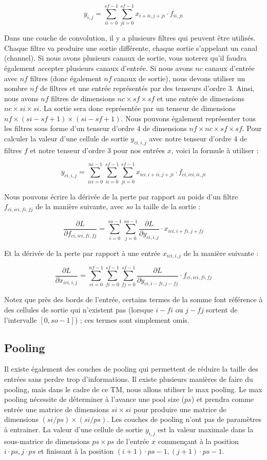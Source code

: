 \documentclass{article}
\begin{document}
\[
y_{i,j} = \sum_{ii=0}^{sf-1} \sum_{ji=0}^{sf-1} x_{i+ii,j+ji} \cdot f_{ii,ji}
\]

Dans une couche de convolution, il y a plusieurs filtres qui peuvent être utilisés. Chaque filtre va produire une sortie différente, chaque sortie s'appelant un canal (channel). Si nous avons plusieurs canaux de sortie, vous noterez qu'il faudra également accepter plusieurs canaux d'entrée. Si nous avons $nc$ canaux d'entrée avec $nf$ filtres (donc également $nf$ canaux de sortie), nous devons utiliser un nombre $nf$ de filtres et une entrée représentés par des tenseurs d'ordre 3. Ainsi, nous avons $nf$ filtres de dimensions $nc \times sf \times sf$ et une entrée de dimensions $nc \times si \times si$. La sortie sera donc représentée par un tenseur de dimensions $nf \times (si - sf + 1) \times (si - sf + 1)$. Nous pouvons également représenter tous les filtres sous forme d'un tenseur d'ordre 4 de dimensions $nf \times nc \times sf \times sf$. Pour calculer la valeur d'une cellule de sortie $y_{ci,i,j}$ avec notre tenseur d'ordre 4 de filtres $f$ et notre tenseur d'ordre 3 pour nos entrées $x$, voici la formule à utiliser : 

\[
y_{ci,i,j} = \sum_{ici=0}^{nc-1} \sum_{ii=0}^{sf-1} \sum_{ji=0}^{sf-1} x_{ici,i+ii,j+ji} \cdot f_{ci,ici,ii,ji}
\]

Nous pouvons écrire la dérivée de la perte par rapport au poids d'un filtre $f_{ci,ici,fi,fj}$ de la manière suivante, avec $so$ la taille de la sortie :

\[
\frac{\partial L}{\partial f_{ci,ici,fi,fj}} = \sum_{i=0}^{so-1} \sum_{j=0}^{so-1} \frac{\partial L}{\partial y_{ci,i,j}} \cdot x_{ici,i+fi,j+fj}
\]

Et la dérivée de la perte par rapport à une entrée $x_{ici,i,j}$ de la manière suivante :

\[
\frac{\partial L}{\partial x_{ici,i,j}} = \sum_{ci=0}^{nf-1} \sum_{fi=0}^{sf-1} \sum_{fj=0}^{sf-1} \frac{\partial L}{\partial y_{ci,i-fi,j-fj}} \cdot f_{ci,ici,fi,fj}
\]

Notez que près des bords de l'entrée, certains termes de la somme font référence à des cellules de sortie qui n'existent pas (lorsque $i - fi$ ou $j - fj$ sortent de l'intervalle $[0, so - 1]$) ; ces termes sont simplement omis.

\subsection{Pooling}

Il existe également des couches de pooling qui permettent de réduire la taille des entrées sans perdre trop d'informations. Il existe plusieurs manières de faire du pooling, mais dans le cadre de ce TM, nous allons utiliser le max pooling. Le max pooling nécessite de déterminer à l'avance une pool size ($ps$) et prendra comme entrée une matrice de dimensions $si \times si$ pour produire une matrice de dimensions $(si / ps) \times (si / ps)$. Les couches de pooling n'ont pas de paramètres à entrainer. La valeur d'une cellule de sortie $y_{i,j}$ est la valeur maximale dans la sous-matrice de dimensions $ps \times ps$ de l'entrée $x$ commençant à la position $i \cdot ps, j \cdot ps$ et finissant à la position $(i + 1) \cdot ps - 1, (j + 1) \cdot ps - 1$.
\end{document}
